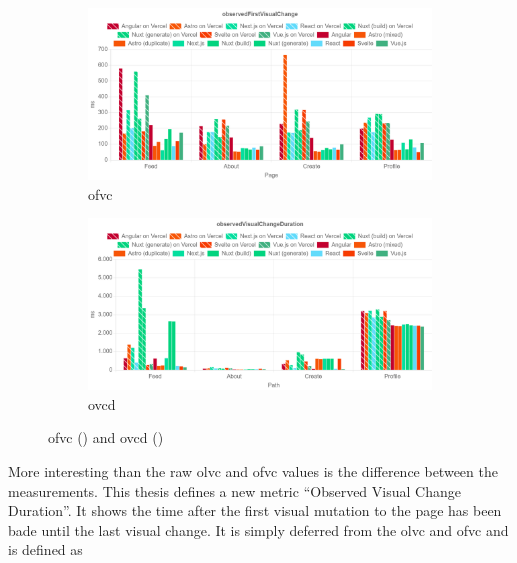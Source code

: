 \documentclass[a4paper, 12pt]{article}
\begin{document}
\begin{figure}[ht!]
  \centering
  \begin{subfigure}{0.95\linewidth}
    \begin{center}
      \includegraphics[width=\linewidth, keepaspectratio]{img/lighthouse-results/OFVC.png}
    \end{center}
    \caption{\acrfull{ofvc}}
    \label{subfig:LH:observedFirstVisualChange}
  \end{subfigure}
  \begin{subfigure}{0.95\linewidth}
    \begin{center}
      \includegraphics[width=\linewidth, keepaspectratio]{img/lighthouse-results/olvc-ofvc.png}
    \end{center}
    \caption{\acrfull{ovcd}}\label{subfig:LH:observedVisualChangeDuration}
    \label{fig:LH:OVCD}
  \end{subfigure}
  \caption{\acrfull{ofvc} () and \acrfull{ovcd} ()}
\end{figure}

\pagebreak

More interesting than the raw \acrshort{olvc} and \acrshort{ofvc} values is the difference between the measurements.
This thesis defines a new metric \enquote{Observed Visual Change Duration}.
It shows the time after the first visual mutation to the page has been bade until the last visual change.
It is simply deferred from the \acrshort{olvc} and \acrshort{ofvc} and is defined as
\end{document}
